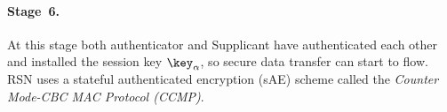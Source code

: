 \paragraph{Stage~6.}
At this stage both authenticator and Supplicant have authenticated each other and installed the session key $\key_\alpha$,
so secure data transfer can start to flow.
RSN uses a stateful authenticated encryption (sAE) scheme called the \emph{Counter Mode-CBC MAC Protocol (CCMP)}. 
